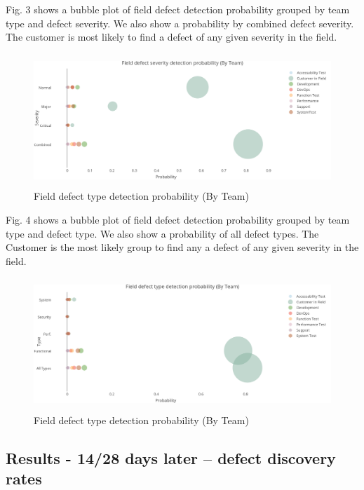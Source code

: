 Fig. 3 shows a bubble plot of field defect detection probability grouped by team type and defect severity. We also show
a probability by combined defect severity. The customer is most likely to find a defect of any given severity in the field.

\begin{figure}
\begin{center}
\includegraphics[height=5cm, width=14cm]{graphs/dogfood/Graph3.png} 
\caption{Field defect type detection probability (By Team)}
\end{center}
\label{fig:fieldliketype}
\end{figure}


Fig. 4 shows a bubble plot of field defect detection probability grouped by team type and defect type. We also show a
probability of all defect types. The Customer is the most likely group to find any a defect of any given severity in the field.


\begin{figure}
\begin{center}
\includegraphics[height=5cm, width=14cm]{graphs/dogfood/Graph4.png} 
\caption{Field defect type detection probability (By Team)}
\end{center}
\label{fig:fieldliketype}
\end{figure}


\subsection{Results - 14/28 days later -- defect discovery rates}

